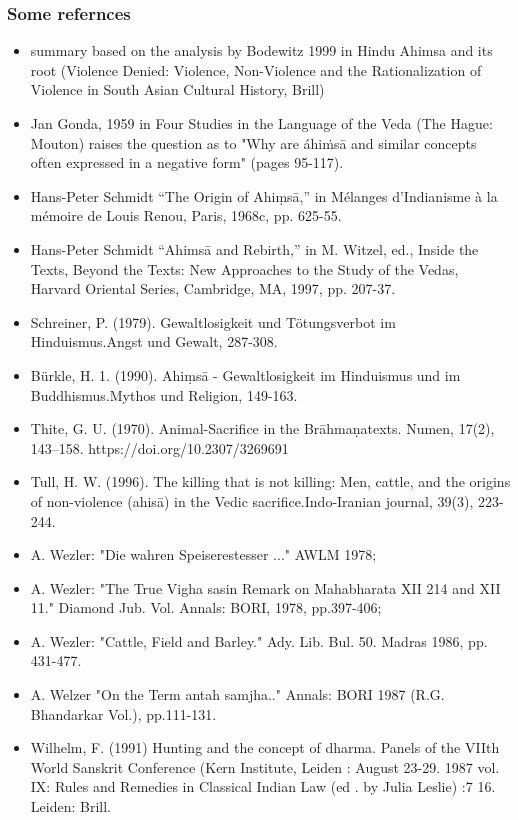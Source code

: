 \documentclass[pdf]{beamer}
\begin{document}
\begin{frame}\frametitle{Some refernces}
\begin{itemize}
	\item summary based on the analysis by Bodewitz 1999 in Hindu Ahimsa and its root (Violence Denied: Violence, Non-Violence and the Rationalization of Violence 		in South Asian Cultural History, Brill) 
	\item Jan Gonda, 1959 in Four Studies in the Language of the Veda (The Hague: Mouton) raises the question as to "Why are áhiṁsā and similar concepts often 		  expressed in a negative form" (pages 95-117).
	
	\item Hans-Peter Schmidt  “The Origin of Ahiṃsā,” in Mélanges d’Indianisme à la mémoire de Louis Renou, Paris, 1968c, pp. 625-55.
	\item Hans-Peter Schmidt  “Ahimsā and Rebirth,” in M. Witzel, ed., Inside the Texts, Beyond the Texts: New Approaches to the Study of the Vedas, Harvard Oriental Series, Cambridge, MA, 1997, pp. 207-37.
	\item Schreiner, P. (1979). Gewaltlosigkeit und Tötungsverbot im Hinduismus.Angst und Gewalt, 287-308.
	\item Bürkle, H. 1. (1990). Ahiṃsā - Gewaltlosigkeit im Hinduismus und im Buddhismus.Mythos und Religion, 149-163.
	\item Thite, G. U. (1970). Animal-Sacrifice in the Brāhmaṇatexts. Numen, 17(2), 143–158. https://doi.org/10.2307/3269691
	\item Tull, H. W. (1996). The killing that is not killing: Men, cattle, and the origins of non-violence (ahisā) in the Vedic sacrifice.Indo-Iranian journal, 39(3), 223-244.
       \item A. Wezler: "Die wahren Speiserestesser ..." AWLM 1978; 
       \item A. Wezler: "The True Vigha sasin Remark on Mahabharata XII 214 and XII 11." Diamond Jub. Vol. Annals: BORI, 1978, pp.397-406; 
      \item A. Wezler: "Cattle, Field and Barley." Ady. Lib. Bul. 50. Madras 1986, pp. 431-477. 
      \item A. Welzer "On the Term antah samjha.." Annals: BORI 1987 (R.G. Bhandarkar Vol.), pp.111-131. 
	\item Wilhelm, F. (1991) Hunting and the concept of dharma. Panels of the VIIth World Sanskrit Conference (Kern Institute, Leiden : August 23-29. 1987 vol.
IX: Rules and Remedies in Classical Indian Law (ed . by Julia Leslie) :7 16. Leiden: Brill. 
	
\end{itemize}
\end{frame}
\end{document}
